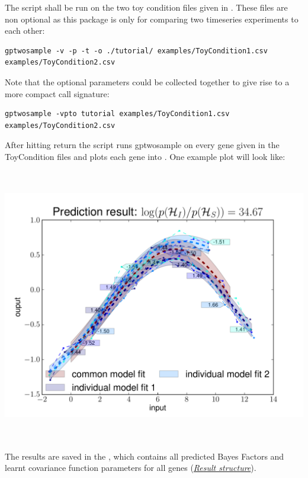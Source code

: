 \documentclass[letterpaper,10pt,english]{sphinxmanual}
\begin{document}
The script shall be run on the two toy condition files 
given in . These files
are non optional as this package is only for comparing two timeseries
experiments to each other:

\begin{Verbatim}[commandchars=\\\{\}]
gptwosample -v -p -t -o ./tutorial/ examples/ToyCondition1.csv examples/ToyCondition2.csv
\end{Verbatim}

Note that the optional parameters could be collected together to give
rise to a more compact call signature:

\begin{Verbatim}[commandchars=\\\{\}]
gptwosample -vpto tutorial examples/ToyCondition1.csv
examples/ToyCondition2.csv
\end{Verbatim}

After hitting return the script runs gptwosample on every gene given
in the ToyCondition files and plots each gene into
. One example plot will look like:

\includegraphics[height=12cm]{timeshiftexample.pdf}

The results are saved in the , which contains all
predicted Bayes Factors and learnt covariance function parameters for
all genes ({\hyperref[results:results]{\emph{Result structure}}}).
\end{document}
